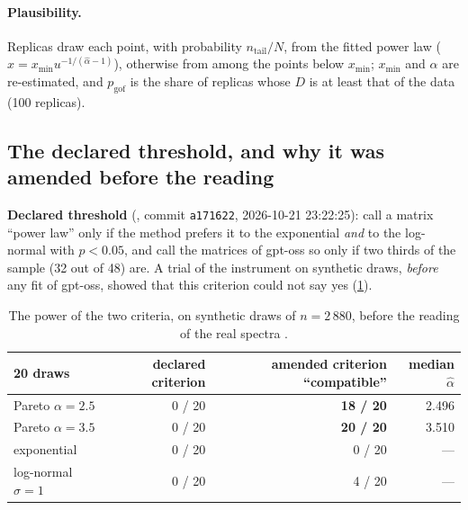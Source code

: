 \paragraph{Plausibility.} Replicas draw each point, with probability $n_{\text{tail}}/N$, from the fitted power law ($x = x_{\min} u^{-1/(\hat\alpha - 1)}$), otherwise from among the points below $x_{\min}$; $x_{\min}$ and $\alpha$ are re-estimated, and $p_{\mathrm{gof}}$ is the share of replicas whose $D$ is at least that of the data (100 replicas).

\subsection{The declared threshold, and why it was amended before the reading}\label{t3spe:sec:amendement}

\textbf{Declared threshold} (, commit \texttt{a171622}, 2026-10-21 23:22:25): call a matrix ``power law'' only if the method prefers it to the exponential \emph{and} to the log-normal with $p < 0.05$, and call the matrices of gpt-oss so only if two thirds of the sample (32 out of 48) are. A trial of the instrument on synthetic draws, \emph{before} any fit of gpt-oss, showed that this criterion could not say yes (\cref{t3spe:tab:puissance}).

\begin{table}[tbp]
\centering\small
\caption[The power of the two criteria]{The power of the two criteria, on synthetic draws of $n = 2\,880$, before the reading of the real spectra \mes.}
\label{t3spe:tab:puissance}
\begin{tabular}{@{}lrrr@{}}
\toprule
20 draws & declared criterion & amended criterion ``compatible'' & median $\hat\alpha$ \\
\midrule
Pareto $\alpha = 2.5$ & 0 / 20 & \textbf{18 / 20} & 2.496 \\
Pareto $\alpha = 3.5$ & 0 / 20 & \textbf{20 / 20} & 3.510 \\
exponential & 0 / 20 & 0 / 20 & --- \\
log-normal $\sigma = 1$ & 0 / 20 & 4 / 20 & --- \\
\bottomrule
\end{tabular}
\end{table}

